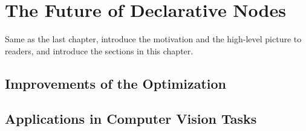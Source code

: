 \chapter{The Future of Declarative Nodes}
\label{cha:futurepart1}
Same as the last chapter, introduce the motivation and the high-level picture to
readers, and introduce the sections in this chapter.

\section{Improvements of the Optimization}

\section{Applications in Computer Vision Tasks}
